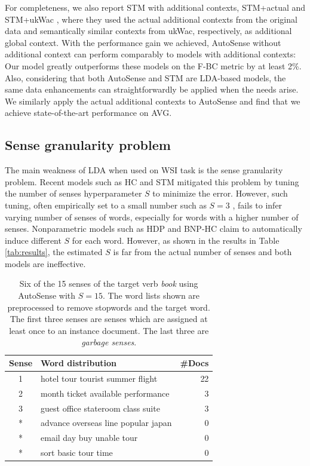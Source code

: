\documentclass[letterpaper]{article}
\begin{document}
For completeness, we also report STM with additional contexts, STM+actual and STM+ukWac \cite{wang2015sense}, where they used the actual additional contexts from the original data and semantically similar contexts from ukWac, respectively, as additional global context. With the performance gain we achieved, AutoSense without additional context can perform comparably to models with additional contexts: Our model greatly outperforms these models on the F-BC metric by at least 2\%. Also, considering that both AutoSense and STM are LDA-based models, the same data enhancements can straightforwardly be applied when the needs arise. We similarly apply the actual additional contexts to AutoSense and find that we achieve state-of-the-art performance on \textsc{AVG}.

\subsection{Sense granularity problem} %
\label{sec:sensegran}

The main weakness of LDA when used on WSI task is the sense granularity problem. Recent models such as HC \cite{chang2014inducing} and STM \cite{wang2015sense} mitigated this problem by tuning the number of senses hyperparameter $S$ to minimize the error. However, such tuning, often empirically set to a small number such as $S=3$ \cite{wang2015sense}, fails to infer varying number of senses of words, especially for words with a higher number of senses. Nonparametric models such as HDP and BNP-HC \cite{lau2013unimelb,chang2014inducing} claim to automatically induce different $S$ for each word. However, as shown in the results in Table \ref{tab:results}, the estimated $S$ is far from the actual number of senses and both models are ineffective.

\begin{table}[!t]
	\centering
	\begin{adjustbox}{width=0.69\columnwidth}
\begin{tabular}{|c|l|r|}
		\hline
		Sense & Word distribution & \#Docs \\ \hline
		1 & hotel tour tourist summer flight & 22 \\ \hline
		2 & month ticket available performance & 3 \\ \hline
		3 & guest office stateroom class suite & 3 \\ \hline
		* & advance overseas line popular japan & 0 \\ \hline
		* & email day buy unable tour & 0 \\ \hline
		* & sort basic tour time & 0 \\ \hline
	\end{tabular}
\end{adjustbox}
	\caption{Six of the 15 senses of the target verb \textit{book} using AutoSense with $S=15$.
		The word lists shown are preprocessed to remove stopwords and the target word.
		The first three senses are senses which are assigned at least once to an instance document. The last three are \textit{garbage senses}.}
	\label{tab:sample}
\end{table}
\label{sec:senses}
\end{document}
